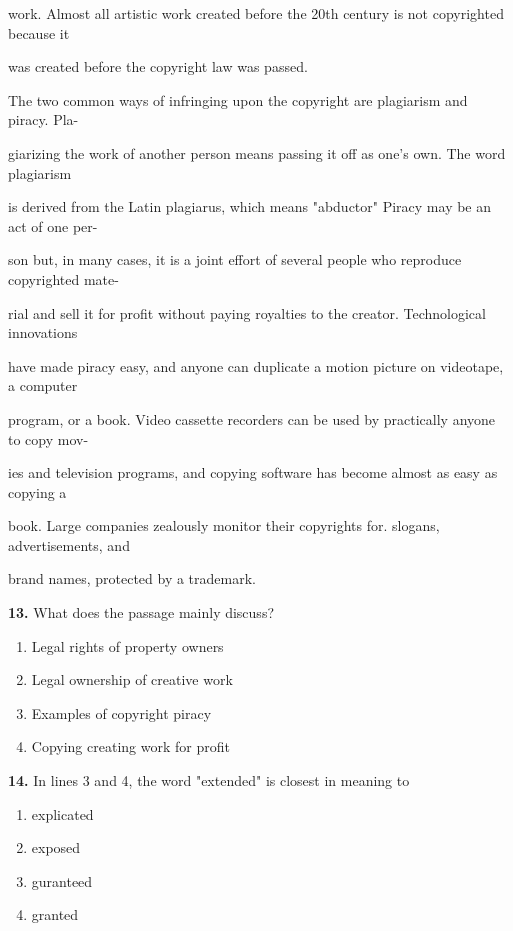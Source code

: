 \documentclass[12pt]{article}
\begin{document}
work. Almost all artistic work created before the 20th century is not copyrighted because it\par
was created before the copyright law was passed.\par
The two common ways of infringing upon the copyright are plagiarism and piracy. Pla-\par
giarizing the work of another person means passing it off as one's own. The word plagiarism\par
is derived from the Latin plagiarus, which means "abductor" Piracy may be an act of one per-\par
son but, in many cases, it is a joint effort of several people who reproduce copyrighted mate-\par
rial and sell it for profit without paying royalties to the creator. Technological innovations\par
have made piracy easy, and anyone can duplicate a motion picture on videotape, a computer\par
program, or a book. Video cassette recorders can be used by practically anyone to copy mov-\par
ies and television programs, and copying software has become almost as easy as copying a\par
book. Large companies zealously monitor their copyrights for. slogans, advertisements, and\par
brand names, protected by a trademark.\par
\endgroup
\medskip
\noindent\textbf{13.} What does the passage mainly discuss?
\begin{enumerate}[label=(\Alph*),leftmargin=*,itemsep=0.2em]
\item Legal rights of property owners
\item Legal ownership of creative work
\item Examples of copyright piracy
\item Copying creating work for profit
\end{enumerate}
\par
\vspace{0.25\baselineskip}
\noindent\textbf{14.} In lines 3 and 4, the word "extended" is closest in meaning to
\begin{enumerate}[label=(\Alph*),leftmargin=*,itemsep=0.2em]
\item explicated
\item exposed
\item guranteed
\item granted
\end{enumerate}
\end{document}
